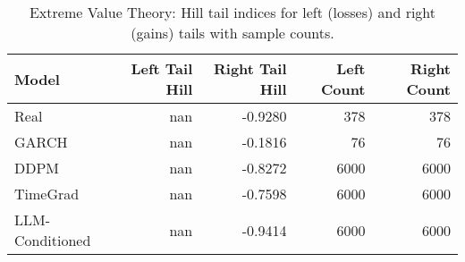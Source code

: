 \begin{table}[htbp]
\centering
\begin{tabular}{lrrrr}
\toprule
Model & Left Tail Hill & Right Tail Hill & Left Count & Right Count \\
\midrule
Real & nan & -0.9280 & 378 & 378 \\
GARCH & nan & -0.1816 & 76 & 76 \\
DDPM & nan & -0.8272 & 6000 & 6000 \\
TimeGrad & nan & -0.7598 & 6000 & 6000 \\
LLM-Conditioned & nan & -0.9414 & 6000 & 6000 \\
\bottomrule
\end{tabular}
\caption{Extreme Value Theory: Hill tail indices for left (losses) and right (gains) tails with sample counts.}
\label{tab:evt_tailindex}
\end{table}
